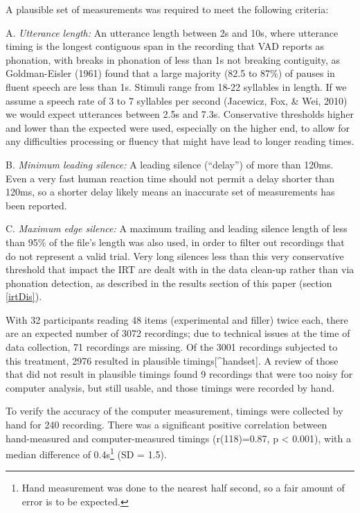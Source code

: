 \documentclass[12pt,oneside]{book}
\let\rmarkdownfootnote\footnote%
\def\footnote{\protect\rmarkdownfootnote}
\begin{document}
A plausible set of measurements was required to meet the following criteria:

A. \emph{Utterance length:} An utterance length between 2s and 10s, where utterance timing is the longest contiguous span in the recording that VAD reports as phonation, with breaks in phonation of less than 1s not breaking contiguity, as Goldman-Eisler (1961) found that a large majority (82.5 to 87\%) of pauses in fluent speech are less than 1s. Stimuli range from 18-22 syllables in length. If we assume a speech rate of 3 to 7 syllables per second (Jacewicz, Fox, \& Wei, 2010) we would expect utterances between 2.5s and 7.3s. Conservative thresholds higher and lower than the expected were used, especially on the higher end, to allow for any difficulties processing or fluency that might have lead to longer reading times.

B. \emph{Minimum leading silence:} A leading silence (``delay'') of more than 120ms. Even a very fast human reaction time should not permit a delay shorter than 120ms, so a shorter delay likely means an inaccurate set of measurements has been reported.

C. \emph{Maximum edge silence:} A maximum trailing and leading silence length of less than 95\% of the file's length was also used, in order to filter out recordings that do not represent a valid trial. Very long silences less than this very conservative threshold that impact the IRT are dealt with in the data clean-up rather than via phonation detection, as described in the results section of this paper (section \ref{irtDis}).

With 32 participants reading 48 items (experimental and filler) twice each, there are an expected number of 3072 recordings; due to technical issues at the time of data collection, 71 recordings are missing. Of the 3001 recordings subjected to this treatment, 2976 resulted in plausible timings{[}\^{}handset{]}. A review of those that did not result in plausible timings found 9 recordings that were too noisy for computer analysis, but still usable, and those timings were recorded by hand.

To verify the accuracy of the computer measurement, timings were collected by hand for 240 recording. There was a significant positive correlation between hand-measured and computer-measured timings (r(118)=0.87, p \textless{} 0.001), with a median difference of 0.4s\footnote{Hand measurement was done to the nearest half second, so a fair amount of error is to be expected.} (SD = 1.5).
\end{document}
